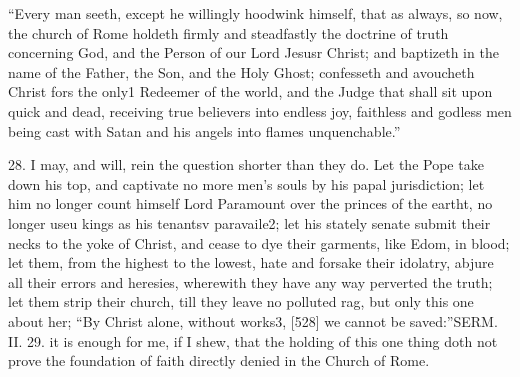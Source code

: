 “Every man seeth, except he willingly hoodwink himself, that as always, so now, the church of Rome holdeth firmly and steadfastly the doctrine of truth concerning God, and the Person of our Lord Jesusr Christ; and baptizeth in the name of the Father, the Son, and the Holy Ghost; confesseth and avoucheth Christ fors the only1 Redeemer of the world, and the Judge that shall sit upon quick and dead, receiving true believers into endless joy, faithless and godless men being cast with Satan and his angels into flames unquenchable.”

28. I may, and will, rein the question shorter than they do. Let the Pope take down his top, and captivate no more men’s souls by his papal jurisdiction; let him no longer count himself Lord Paramount over the princes of the eartht, no longer useu kings as his tenantsv paravaile2; let his stately senate submit their necks to the yoke of Christ, and cease to dye their garments, like Edom, in blood; let them, from the highest to the lowest, hate and forsake their idolatry, abjure all their errors and heresies, wherewith they have any way perverted the truth; let them strip their church, till they leave no polluted rag, but only this one about her; “By Christ alone, without works3, [528] we cannot be saved:”SERM. II. 29. it is enough for me, if I shew, that the holding of this one thing doth not prove the foundation of faith directly denied in the Church of Rome.

